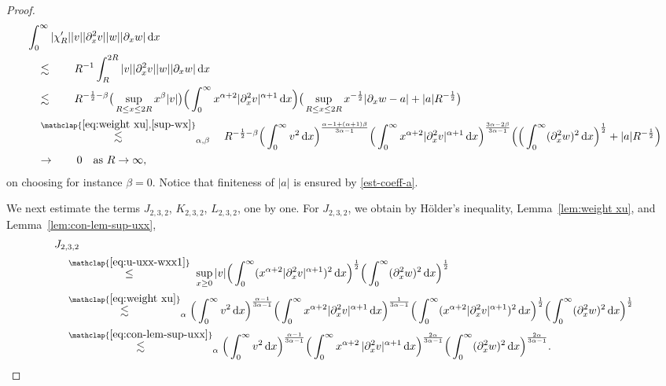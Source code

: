 \documentclass[reqno,12pt]{amsart}
\renewcommand{\d}{\ensuremath{\mathrm{d}}}
\renewcommand{\d}{\ensuremath{{\rm d}}}
\numberwithin{equation}{section}
\begin{document}
\begin{proof}
%
\begin{align*}
&\int_0^\infty |\chi_R'| |v| |\partial_x^2 v| |w| |\partial_x w| \, \d x \\
& \quad \lesssim \qquad R^{-1} \int_R^{2R} |v| |\partial_x^2 v| |w| |\partial_x w| \, \d x \\
& \quad \lesssim \qquad R^{-\frac 1 2 - \beta} \big(\sup_{R \le x \le 2R} x^\beta |v|\big) \Big(\int_0^\infty x^{\alpha+2} |\partial_x^2 v|^{\alpha+1} \, \d x\Big) \big(\sup_{R \le x \le 2R} x^{-\frac 1 2} |\partial_x w - a| + |a| R^{-\frac 1 2}\big) \\
& \quad \stackrel{\mathclap{\eqref{eq:weight xu}, \eqref{sup-wx}}}{\lesssim}_{\alpha,\beta} \quad R^{-\frac 1 2 - \beta} \Big(\int_0^\infty v^2 \, \d x\Big)^{\frac{\alpha-1+(\alpha+1)\beta}{3\alpha-1}} \Big(\int_0^\infty x^{\alpha+2} |\partial_x^2 v|^{\alpha+1} \, \d x\Big)^{\frac{3\alpha-2\beta}{3\alpha-1}} \Big(\Big(\int_0^\infty (\partial_x^2 w)^2 \, \d x\Big)^{\frac 1 2} + |a| R^{-\frac 1 2}\Big) \\
& \quad \to \qquad 0 \quad \text{as } R \to \infty,
\end{align*}
%
on choosing for instance $\beta = 0$. Notice that finiteness of $|a|$ is ensured by \eqref{est-coeff-a}.

%
\bigskip
%

We next estimate the terms $J_{2,3,2}$, $K_{2,3,2}$, $L_{2,3,2}$, one by one. 
For $J_{2,3,2}$, we obtain by H\"older's inequality, Lemma~\ref{lem:weight xu}, and Lemma~\ref{lem:con-lem-sup-uxx},
%
\begin{align}
   &J_{2,3,2} \nonumber \\
   & \quad \stackrel{\mathclap{\eqref{eq:u-uxx-wxx1}}}{\leq} \; 
    \sup_{x\geq 0} |v| \Big( \int_0^\infty (x^{\alpha+2} |\partial_x^2 v|^{\alpha +1})^2 \, \d x\Big)^{\frac{1}{2}} \Big( \int_0^\infty (\partial_x^2 w)^2 \, \d x\Big)^{\frac{1}{2}} \nonumber
    \\
    & \quad \stackrel{\mathclap{\eqref{eq:weight xu}}}{\lesssim}_{\alpha}
    \Big(\int_0^\infty v^2\, \d x\Big)^\frac{\alpha-1}{3\alpha-1}
    \Big(\int_0^\infty x^{\alpha+2} |\partial_x^2 v|^{\alpha+1}\, \d x\Big)^\frac{1}{3\alpha-1} \Big( \int_0^\infty (x^{\alpha+2} |\partial_x^2 v|^{\alpha +1})^2 \, \d x\Big)^{\frac{1}{2}} \Big( \int_0^\infty (\partial_x^2 w)^2 \, \d x\Big)^{\frac{1}{2}} \nonumber \\
    & \quad \stackrel{\mathclap{\eqref{eq:con-lem-sup-uxx}}}{\lesssim}_{\alpha} \Big(\int_0^\infty v^2\, \d x\Big)^\frac{\alpha-1}{3\alpha-1}
    \Big(\int_0^\infty x^{\alpha +2} \, |\partial_x^2 v|^{\alpha +1} \, \d x\Big)^{\frac{2\alpha}{3\alpha-1}}
    \Big( \int_0^\infty (\partial_x^2 w)^2 \, \d x\Big)^{\frac{2\alpha}{3\alpha-1}}. \label{eq:est-u-uxx-w-wxx}
\end{align}
%


\end{proof}
\end{document}
